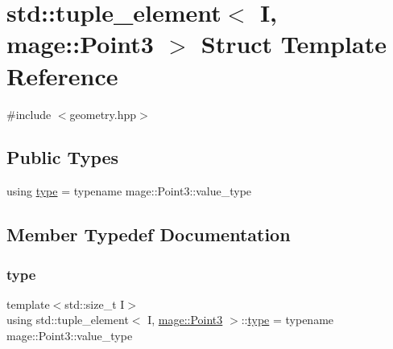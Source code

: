 \hypertarget{structstd_1_1tuple__element_3_01_i_00_01mage_1_1_point3_01_4}{}\section{std\+:\+:tuple\+\_\+element$<$ I, mage\+:\+:Point3 $>$ Struct Template Reference}
\label{structstd_1_1tuple__element_3_01_i_00_01mage_1_1_point3_01_4}


{\ttfamily \#include $<$geometry.\+hpp$>$}

\subsection*{Public Types}
\begin{DoxyCompactItemize}
\item 
using \mbox{\hyperlink{structstd_1_1tuple__element_3_01_i_00_01mage_1_1_point3_01_4_a3a2128442434af529b2eb94f631fb259}{type}} = typename mage\+::\+Point3\+::value\+\_\+type
\end{DoxyCompactItemize}


\subsection{Member Typedef Documentation}
\mbox{\label{structstd_1_1tuple__element_3_01_i_00_01mage_1_1_point3_01_4_a3a2128442434af529b2eb94f631fb259}} 
\subsubsection{\texorpdfstring{type}{type}}
{\footnotesize\ttfamily template$<$std\+::size\+\_\+t I$>$ \\
using std\+::tuple\+\_\+element$<$ I, \mbox{\hyperlink{structmage_1_1_point3}{mage\+::\+Point3}} $>$\+::\mbox{\hyperlink{structstd_1_1tuple__element_3_01_i_00_01mage_1_1_point3_01_4_a3a2128442434af529b2eb94f631fb259}{type}} =  typename mage\+::\+Point3\+::value\+\_\+type}

